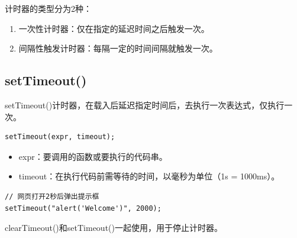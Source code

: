 计时器的类型分为2种：

\begin{enumerate}
	\item 一次性计时器：仅在指定的延迟时间之后触发一次。
	\item 间隔性触发计时器：每隔一定的时间间隔就触发一次。
\end{enumerate}

\begin{table}[H]
	\centering
	\caption{计时器方法}
\end{table}

\vspace{0.5cm}

\subsection{setTimeout()}

setTimeout()计时器，在载入后延迟指定时间后，去执行一次表达式，仅执行一次。\\

\begin{lstlisting}[style=htmlcssjs]
setTimeout(expr, timeout);
\end{lstlisting}

\begin{itemize}
	\item expr：要调用的函数或要执行的代码串。
	\item timeout：在执行代码前需等待的时间，以毫秒为单位（1s = 1000ms）。
\end{itemize}

\begin{lstlisting}[style=htmlcssjs]
// 网页打开2秒后弹出提示框
setTimeout("alert('Welcome')", 2000);
\end{lstlisting}

clearTimeout()和setTimeout()一起使用，用于停止计时器。\\

